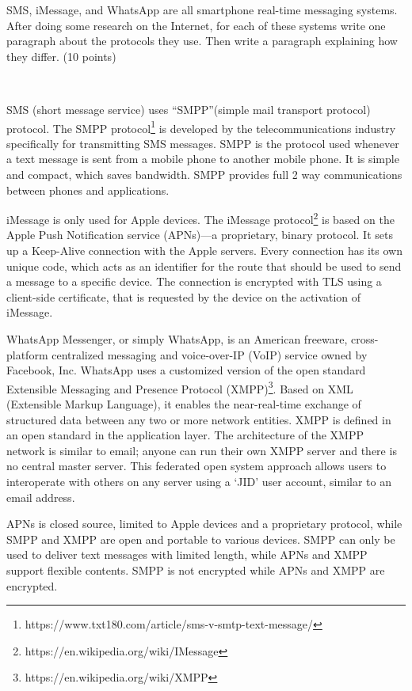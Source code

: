 \begin{exercise}[]{ SMS, iMessage, and WhatsApp are all smartphone real-time messaging systems. After doing some research on the Internet, for each of these systems write one paragraph about the protocols they use. Then write a paragraph explaining how they differ. (10 points)
    }
  \begin{solution}
  \par{~}

  SMS (short message service) uses ``SMPP''(simple mail transport protocol) protocol. The SMPP protocol\footnote{https://www.txt180.com/article/sms-v-smtp-text-message/} is developed by the telecommunications industry specifically for transmitting SMS messages. SMPP is the protocol used whenever a text message is sent from a mobile phone to another mobile phone. It is simple and compact, which saves bandwidth. SMPP provides full 2 way communications between phones and applications.

  iMessage is only used for Apple devices. The iMessage protocol\footnote{https://en.wikipedia.org/wiki/IMessage} is based on the Apple Push Notification service (APNs)—a proprietary, binary protocol. It sets up a Keep-Alive connection with the Apple servers. Every connection has its own unique code, which acts as an identifier for the route that should be used to send a message to a specific device. The connection is encrypted with TLS using a client-side certificate, that is requested by the device on the activation of iMessage.

  WhatsApp Messenger, or simply WhatsApp, is an American freeware, cross-platform centralized messaging and voice-over-IP (VoIP) service owned by Facebook, Inc. WhatsApp uses a customized version of the open standard Extensible Messaging and Presence Protocol (XMPP)\footnote{https://en.wikipedia.org/wiki/XMPP}. Based on XML (Extensible Markup Language), it enables the near-real-time exchange of structured data between any two or more network entities. XMPP is defined in an open standard in the application layer. The architecture of the XMPP network is similar to email; anyone can run their own XMPP server and there is no central master server. This federated open system approach allows users to interoperate with others on any server using a `JID' user account, similar to an email address.




  APNs is closed source, limited to Apple devices and a proprietary protocol, while SMPP and XMPP are open and portable to various devices. SMPP can only be used to deliver text messages with limited length, while APNs and XMPP support flexible contents. SMPP is not encrypted while APNs and XMPP are encrypted.
  \end{solution}
  \label{ex1}
\end{exercise}


